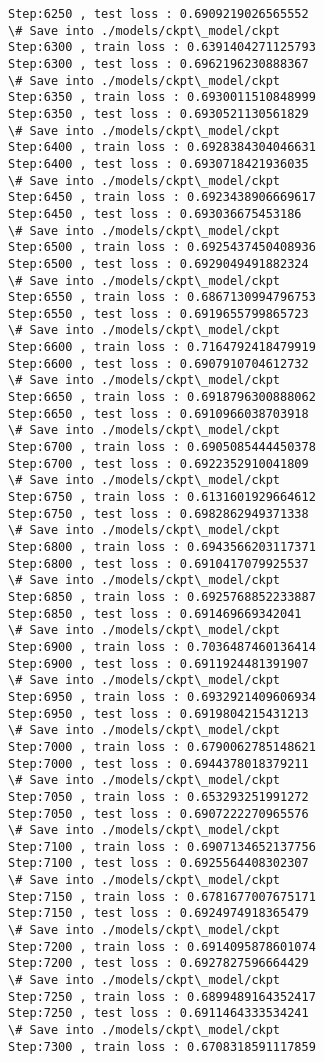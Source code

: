 \documentclass[11pt]{article}
\begin{document}
\begin{Verbatim}[commandchars=\\\{\}]
Step:6250 , test loss : 0.6909219026565552
\# Save into ./models/ckpt\_model/ckpt
Step:6300 , train loss : 0.6391404271125793
Step:6300 , test loss : 0.6962196230888367
\# Save into ./models/ckpt\_model/ckpt
Step:6350 , train loss : 0.6930011510848999
Step:6350 , test loss : 0.6930521130561829
\# Save into ./models/ckpt\_model/ckpt
Step:6400 , train loss : 0.6928384304046631
Step:6400 , test loss : 0.6930718421936035
\# Save into ./models/ckpt\_model/ckpt
Step:6450 , train loss : 0.6923438906669617
Step:6450 , test loss : 0.693036675453186
\# Save into ./models/ckpt\_model/ckpt
Step:6500 , train loss : 0.6925437450408936
Step:6500 , test loss : 0.6929049491882324
\# Save into ./models/ckpt\_model/ckpt
Step:6550 , train loss : 0.6867130994796753
Step:6550 , test loss : 0.6919655799865723
\# Save into ./models/ckpt\_model/ckpt
Step:6600 , train loss : 0.7164792418479919
Step:6600 , test loss : 0.6907910704612732
\# Save into ./models/ckpt\_model/ckpt
Step:6650 , train loss : 0.6918796300888062
Step:6650 , test loss : 0.6910966038703918
\# Save into ./models/ckpt\_model/ckpt
Step:6700 , train loss : 0.6905085444450378
Step:6700 , test loss : 0.6922352910041809
\# Save into ./models/ckpt\_model/ckpt
Step:6750 , train loss : 0.6131601929664612
Step:6750 , test loss : 0.6982862949371338
\# Save into ./models/ckpt\_model/ckpt
Step:6800 , train loss : 0.6943566203117371
Step:6800 , test loss : 0.6910417079925537
\# Save into ./models/ckpt\_model/ckpt
Step:6850 , train loss : 0.6925768852233887
Step:6850 , test loss : 0.691469669342041
\# Save into ./models/ckpt\_model/ckpt
Step:6900 , train loss : 0.7036487460136414
Step:6900 , test loss : 0.6911924481391907
\# Save into ./models/ckpt\_model/ckpt
Step:6950 , train loss : 0.6932921409606934
Step:6950 , test loss : 0.6919804215431213
\# Save into ./models/ckpt\_model/ckpt
Step:7000 , train loss : 0.6790062785148621
Step:7000 , test loss : 0.6944378018379211
\# Save into ./models/ckpt\_model/ckpt
Step:7050 , train loss : 0.653293251991272
Step:7050 , test loss : 0.6907222270965576
\# Save into ./models/ckpt\_model/ckpt
Step:7100 , train loss : 0.6907134652137756
Step:7100 , test loss : 0.6925564408302307
\# Save into ./models/ckpt\_model/ckpt
Step:7150 , train loss : 0.6781677007675171
Step:7150 , test loss : 0.6924974918365479
\# Save into ./models/ckpt\_model/ckpt
Step:7200 , train loss : 0.6914095878601074
Step:7200 , test loss : 0.6927827596664429
\# Save into ./models/ckpt\_model/ckpt
Step:7250 , train loss : 0.6899489164352417
Step:7250 , test loss : 0.6911464333534241
\# Save into ./models/ckpt\_model/ckpt
Step:7300 , train loss : 0.6708318591117859

\end{Verbatim}
\end{document}
